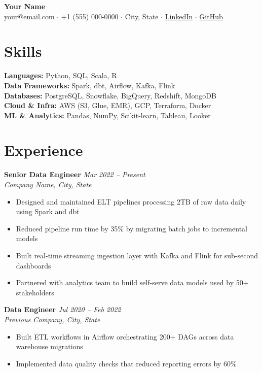 \documentclass[11pt,a4paper]{article}
\begin{document}
\begin{center}
  {\LARGE \textbf{Your Name}} \\[4pt]
  your@email.com $\cdot$ +1 (555) 000-0000 $\cdot$ City, State $\cdot$
  \href{https://linkedin.com/in/yourprofile}{LinkedIn} $\cdot$
  \href{https://github.com/yourhandle}{GitHub}
\end{center}

\section{Skills}
\textbf{Languages:} Python, SQL, Scala, R \\
\textbf{Data Frameworks:} Spark, dbt, Airflow, Kafka, Flink \\
\textbf{Databases:} PostgreSQL, Snowflake, BigQuery, Redshift, MongoDB \\
\textbf{Cloud \& Infra:} AWS (S3, Glue, EMR), GCP, Terraform, Docker \\
\textbf{ML \& Analytics:} Pandas, NumPy, Scikit-learn, Tableau, Looker

\section{Experience}

\textbf{Senior Data Engineer} \hfill \textit{Mar 2022 -- Present} \\
\textit{Company Name, City, State}
\begin{itemize}[leftmargin=*, noitemsep, topsep=2pt]
  \item Designed and maintained ELT pipelines processing 2TB of raw data daily using Spark and dbt
  \item Reduced pipeline run time by 35\% by migrating batch jobs to incremental models
  \item Built real-time streaming ingestion layer with Kafka and Flink for sub-second dashboards
  \item Partnered with analytics team to build self-serve data models used by 50+ stakeholders
\end{itemize}

\vspace{4pt}
\textbf{Data Engineer} \hfill \textit{Jul 2020 -- Feb 2022} \\
\textit{Previous Company, City, State}
\begin{itemize}[leftmargin=*, noitemsep, topsep=2pt]
  \item Built ETL workflows in Airflow orchestrating 200+ DAGs across data warehouse migrations
  \item Implemented data quality checks that reduced reporting errors by 60\%
\end{itemize}
\end{document}
